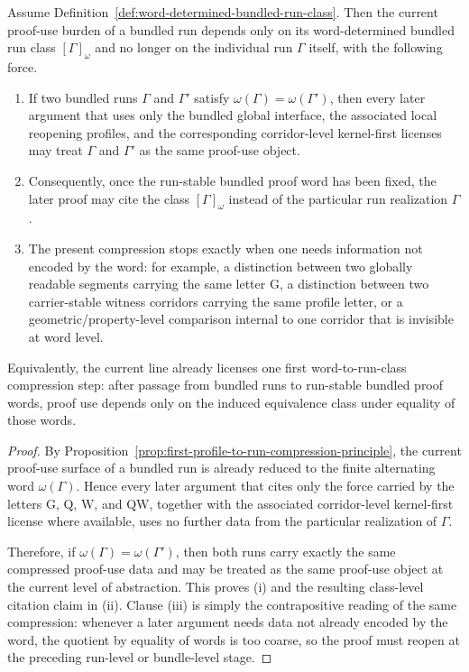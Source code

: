 \begin{proposition}
\label{prop:first-word-to-run-class-compression-principle}
Assume Definition~\ref{def:word-determined-bundled-run-class}. Then the current proof-use burden of a bundled run depends only on its word-determined bundled run class $[\Gamma]_{\omega}$ and no longer on the individual run $\Gamma$ itself, with the following force.
\begin{enumerate}[leftmargin=2em,label=(\roman*)]
\item If two bundled runs $\Gamma$ and $\Gamma'$ satisfy $\omega(\Gamma)=\omega(\Gamma')$, then every later argument that uses only the bundled global interface, the associated local reopening profiles, and the corresponding corridor-level kernel-first licenses may treat $\Gamma$ and $\Gamma'$ as the same proof-use object.
\item Consequently, once the run-stable bundled proof word has been fixed, the later proof may cite the class $[\Gamma]_{\omega}$ instead of the particular run realization $\Gamma$.
\item The present compression stops exactly when one needs information not encoded by the word: for example, a distinction between two globally readable segments carrying the same letter $\mathrm G$, a distinction between two carrier-stable witness corridors carrying the same profile letter, or a geometric/property-level comparison internal to one corridor that is invisible at word level.
\end{enumerate}
Equivalently, the current line already licenses one first word-to-run-class compression step: after passage from bundled runs to run-stable bundled proof words, proof use depends only on the induced equivalence class under equality of those words.
\end{proposition}

\begin{proof}
By Proposition~\ref{prop:first-profile-to-run-compression-principle}, the current proof-use surface of a bundled run is already reduced to the finite alternating word $\omega(\Gamma)$. Hence every later argument that cites only the force carried by the letters $\mathrm G$, $\mathrm Q$, $\mathrm W$, and $\mathrm{QW}$, together with the associated corridor-level kernel-first license where available, uses no further data from the particular realization of $\Gamma$.

Therefore, if $\omega(\Gamma)=\omega(\Gamma')$, then both runs carry exactly the same compressed proof-use data and may be treated as the same proof-use object at the current level of abstraction. This proves (i) and the resulting class-level citation claim in (ii). Clause (iii) is simply the contrapositive reading of the same compression: whenever a later argument needs data not already encoded by the word, the quotient by equality of words is too coarse, so the proof must reopen at the preceding run-level or bundle-level stage.
\end{proof}

